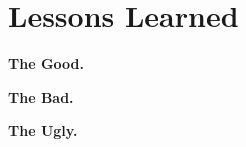 \section{Lessons Learned}

\vspace{1ex}\noindent{}\textbf{The Good.}

\vspace{1ex}\noindent{}\textbf{The Bad.}

\vspace{1ex}\noindent{}\textbf{The Ugly.}
